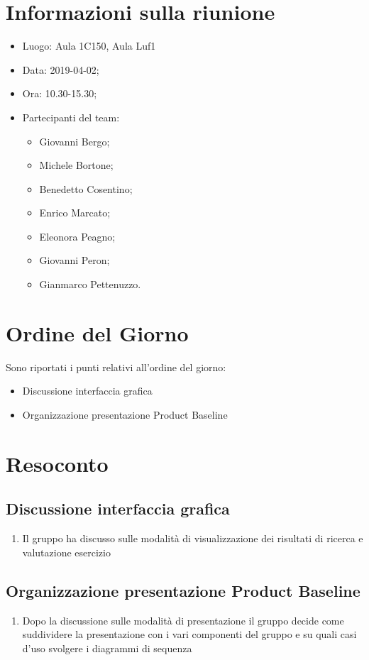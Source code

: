 \documentclass[11pt,a4paper]{article}
\begin{document}
	\section{Informazioni sulla riunione}
	\begin{itemize}
		\item Luogo: Aula 1C150, Aula Luf1
		\item Data: 2019-04-02;
		\item Ora: 10.30-15.30;
		\item Partecipanti del team:
			\begin{itemize}
				\item Giovanni Bergo;
				\item Michele Bortone;
				\item Benedetto Cosentino;
				\item Enrico Marcato;
				\item Eleonora Peagno;
				\item Giovanni Peron;
				\item Gianmarco Pettenuzzo.
				
			\end{itemize}
	\end{itemize}
	
	\section{Ordine del Giorno}
	Sono riportati i punti relativi all'ordine del giorno:
	\begin{itemize}
		\item Discussione interfaccia grafica
		
		\item Organizzazione presentazione Product Baseline
	\end{itemize}
	
	\section{Resoconto}
	\subsection{Discussione interfaccia grafica}
	\begin{enumerate}
		
		\item Il gruppo ha discusso sulle modalità di visualizzazione dei risultati di ricerca e valutazione esercizio

	\end{enumerate}
	

	
	\subsection{Organizzazione presentazione Product Baseline}
	\begin{enumerate}
	\item Dopo la discussione sulle modalità di presentazione il gruppo decide come suddividere la presentazione con i vari componenti del gruppo e su quali casi d'uso svolgere i diagrammi di sequenza

	\end{enumerate}
	
\end{document}
